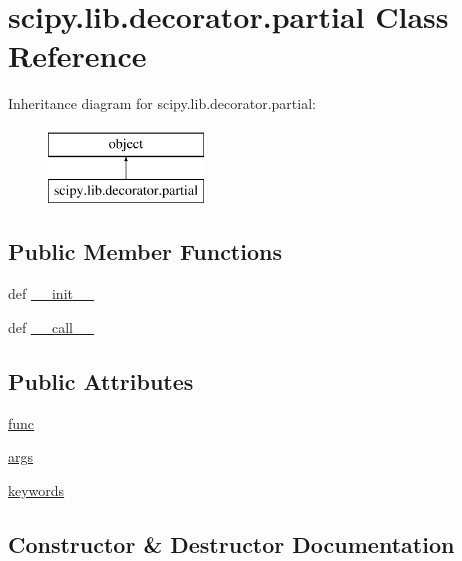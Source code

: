 \hypertarget{classscipy_1_1lib_1_1decorator_1_1partial}{}\section{scipy.\+lib.\+decorator.\+partial Class Reference}
\label{classscipy_1_1lib_1_1decorator_1_1partial}
Inheritance diagram for scipy.\+lib.\+decorator.\+partial\+:\begin{figure}[H]
\begin{center}
\leavevmode
\includegraphics[height=2.000000cm]{classscipy_1_1lib_1_1decorator_1_1partial}
\end{center}
\end{figure}
\subsection*{Public Member Functions}
\begin{DoxyCompactItemize}
\item 
def \hyperlink{classscipy_1_1lib_1_1decorator_1_1partial_a74e66cfaebae6a8a20bee8274b717220}{\+\_\+\+\_\+init\+\_\+\+\_\+}
\item 
def \hyperlink{classscipy_1_1lib_1_1decorator_1_1partial_a5ad1add515bfdfb65a8e77fb8e250d69}{\+\_\+\+\_\+call\+\_\+\+\_\+}
\end{DoxyCompactItemize}
\subsection*{Public Attributes}
\begin{DoxyCompactItemize}
\item 
\hyperlink{classscipy_1_1lib_1_1decorator_1_1partial_a17d5cf4a6a50e6caed60cb116f08720d}{func}
\item 
\hyperlink{classscipy_1_1lib_1_1decorator_1_1partial_a185fbad28f16c6a13f4cd08a33aa18ec}{args}
\item 
\hyperlink{classscipy_1_1lib_1_1decorator_1_1partial_a76fcec6a94e94edf219ad4114a2f067e}{keywords}
\end{DoxyCompactItemize}


\subsection{Constructor \& Destructor Documentation}
\hypertarget{classscipy_1_1lib_1_1decorator_1_1partial_a74e66cfaebae6a8a20bee8274b717220}{}
